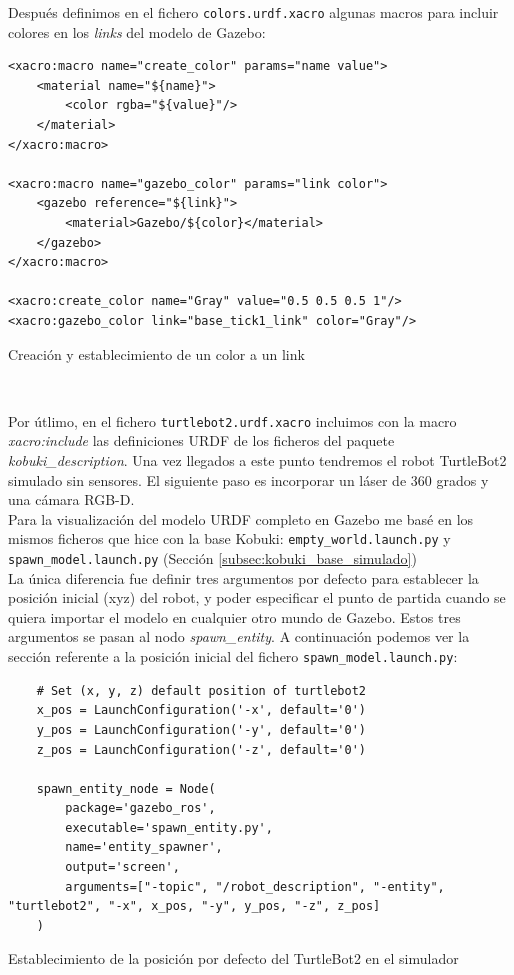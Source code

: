 Después definimos en el fichero \texttt{colors.urdf.xacro} algunas macros para incluir colores en los \textit{links} del modelo de Gazebo:\\
\begin{code}[H]
\begin{lstlisting}
<xacro:macro name="create_color" params="name value">
	<material name="${name}">
		<color rgba="${value}"/>
	</material>
</xacro:macro>

<xacro:macro name="gazebo_color" params="link color">
	<gazebo reference="${link}">
		<material>Gazebo/${color}</material>
	</gazebo>
</xacro:macro>

<xacro:create_color name="Gray" value="0.5 0.5 0.5 1"/>
<xacro:gazebo_color link="base_tick1_link" color="Gray"/>
\end{lstlisting}
\caption{Creación y establecimiento de un color a un link}
\label{fig:creacion_color_link}
\end{code}\

Por útlimo, en el fichero \texttt{turtlebot2.urdf.xacro} incluimos con la macro \textit{xacro:include} las definiciones URDF de los ficheros del paquete \textit{kobuki\_description}. Una vez llegados a este punto tendremos el robot TurtleBot2 simulado sin sensores. El siguiente paso es incorporar un láser de 360 grados y una cámara RGB-D.\\

Para la visualización del modelo URDF completo en Gazebo me basé en los mismos ficheros que hice con la base Kobuki: \texttt{empty\_world.launch.py} y \texttt{spawn\_model.launch.py} (Sección \ref{subsec:kobuki_base_simulado})\\

La única diferencia fue definir tres argumentos por defecto para establecer la posición inicial (xyz) del robot, y poder especificar el punto de partida cuando se quiera importar el modelo en cualquier otro mundo de Gazebo. Estos tres argumentos se pasan al nodo \textit{spawn\_entity}. A continuación podemos ver la sección referente a la posición inicial del fichero \texttt{spawn\_model.launch.py}:\\

\begin{code}[H]
\begin{lstlisting}
	# Set (x, y, z) default position of turtlebot2
	x_pos = LaunchConfiguration('-x', default='0')
	y_pos = LaunchConfiguration('-y', default='0')
	z_pos = LaunchConfiguration('-z', default='0')
	
	spawn_entity_node = Node(
		package='gazebo_ros',
		executable='spawn_entity.py',
		name='entity_spawner',
		output='screen',
		arguments=["-topic", "/robot_description", "-entity", "turtlebot2", "-x", x_pos, "-y", y_pos, "-z", z_pos]
	)
\end{lstlisting}
\caption{Establecimiento de la posición por defecto del TurtleBot2 en el simulador}
\label{cod:posicion_defecto_turtlebot2_simulador}
\end{code}\

